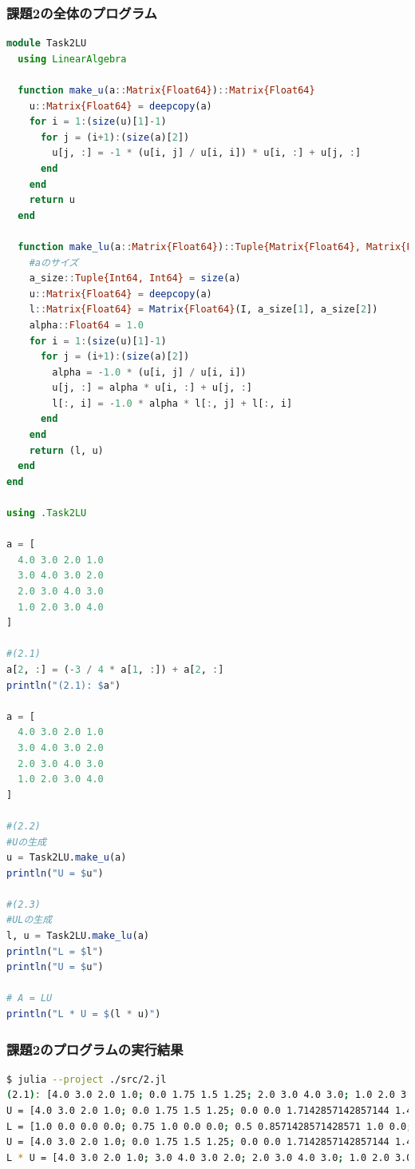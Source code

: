\documentclass[uplatex, dvipdfmx, a4j,11pt]{jsarticle}
\begin{document}
\subsubsection*{課題2の全体のプログラム}
\begin{lstlisting}[title={課題2の全体のプログラム}, label=code:in, language=Julia]
module Task2LU
  using LinearAlgebra
  
  function make_u(a::Matrix{Float64})::Matrix{Float64}
    u::Matrix{Float64} = deepcopy(a)
    for i = 1:(size(u)[1]-1)
      for j = (i+1):(size(a)[2])
        u[j, :] = -1 * (u[i, j] / u[i, i]) * u[i, :] + u[j, :]
      end
    end
    return u
  end
  
  function make_lu(a::Matrix{Float64})::Tuple{Matrix{Float64}, Matrix{Float64}}
    #aのサイズ
    a_size::Tuple{Int64, Int64} = size(a)
    u::Matrix{Float64} = deepcopy(a)
    l::Matrix{Float64} = Matrix{Float64}(I, a_size[1], a_size[2])
    alpha::Float64 = 1.0
    for i = 1:(size(u)[1]-1)
      for j = (i+1):(size(a)[2])
        alpha = -1.0 * (u[i, j] / u[i, i])
        u[j, :] = alpha * u[i, :] + u[j, :]
        l[:, i] = -1.0 * alpha * l[:, j] + l[:, i]
      end
    end
    return (l, u)
  end
end

using .Task2LU

a = [
  4.0 3.0 2.0 1.0
  3.0 4.0 3.0 2.0
  2.0 3.0 4.0 3.0
  1.0 2.0 3.0 4.0
]

#(2.1)
a[2, :] = (-3 / 4 * a[1, :]) + a[2, :]
println("(2.1): $a")

a = [
  4.0 3.0 2.0 1.0
  3.0 4.0 3.0 2.0
  2.0 3.0 4.0 3.0
  1.0 2.0 3.0 4.0
]

#(2.2)
#Uの生成
u = Task2LU.make_u(a)
println("U = $u")

#(2.3)
#ULの生成
l, u = Task2LU.make_lu(a)
println("L = $l")
println("U = $u")

# A = LU
println("L * U = $(l * u)")
\end{lstlisting}

\subsubsection*{課題2のプログラムの実行結果}
\begin{lstlisting}[title={課題2のプログラムの実行結果}, label=code:in, language=sh]
$ julia --project ./src/2.jl
(2.1): [4.0 3.0 2.0 1.0; 0.0 1.75 1.5 1.25; 2.0 3.0 4.0 3.0; 1.0 2.0 3.0 4.0]
U = [4.0 3.0 2.0 1.0; 0.0 1.75 1.5 1.25; 0.0 0.0 1.7142857142857144 1.4285714285714286; 0.0 0.0 0.0 1.6666666666666667]
L = [1.0 0.0 0.0 0.0; 0.75 1.0 0.0 0.0; 0.5 0.8571428571428571 1.0 0.0; 0.25 0.7142857142857143 0.8333333333333333 1.0]
U = [4.0 3.0 2.0 1.0; 0.0 1.75 1.5 1.25; 0.0 0.0 1.7142857142857144 1.4285714285714286; 0.0 0.0 0.0 1.6666666666666667]
L * U = [4.0 3.0 2.0 1.0; 3.0 4.0 3.0 2.0; 2.0 3.0 4.0 3.0; 1.0 2.0 3.0 4.0]
\end{lstlisting}
\end{document}
